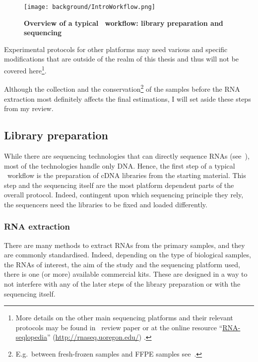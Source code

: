 \begin{figure}
    \texttt{[image: background/IntroWorkflow.png]}\centering
    \caption[Overview of a \Rnaseq\ workflow: library preparation
    and sequencing]{\label{fig:OverviewRnaseqPrepSeq}\textbf{Overview of
    a typical \Rnaseq\ workflow:
    library preparation and sequencing}}
\end{figure}

Experimental protocols for other platforms may need various and specific
modifications that are outside of the realm of this thesis and thus will not be
covered here\footnote{More details on the other main sequencing platforms and their
relevant protocols may be found in~\citet{rnaseqProtocols} review paper or at the
online resource \enquote{\href{http://rnaseq.uoregon.edu/}{RNA-seqlopedia}}
(\href{http://rnaseq.uoregon.edu/}{http://rnaseq.uoregon.edu/})
.}.\mybr\

Although the collection and the conservation\footnote{E.g.\ between fresh-frozen
samples and \gls{FFPE} samples see~\citet{sampleConservationMatters}.}
of the samples before the
\gls{RNA} extraction most definitely affects the final estimations,
I will set aside these steps from my review.\mybr\

\subsection{Library preparation}\label{subsec:libPrep}

While there are sequencing technologies that can directly sequence \glspl{RNA}
(see~\cite{rnaDirectSeq}), most of the technologies handle only \gls{DNA}.
Hence, the first step of a typical \Rnaseq\ workflow is the preparation of
\gls{cDNA} libraries from the starting material. This step and the sequencing
itself are the most platform dependent parts of the overall protocol.
Indeed, contingent upon which sequencing principle they rely,
the sequencers need the libraries to be fixed and loaded differently.\mybr\

\subsubsection{\gls{RNA} extraction}

There are many methods to extract \glspl{RNA} from the primary samples, and they
are commonly standardised. Indeed, depending on the type of biological samples,
the \glspl{RNA} of interest, the aim of the  study and the sequencing platform
used, there is one (or more) available commercial kits. These are designed in
a way to not interfere
with any of the later steps of the library preparation or with the sequencing
itself.\mybr\

